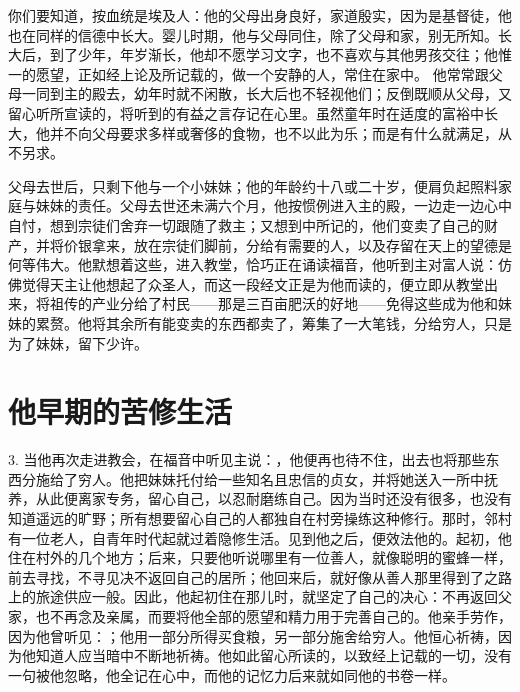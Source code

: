 你们要知道，按血统是埃及人：他的父母出身良好，家道殷实，因为是基督徒，他也在同样的信德中长大。婴儿时期，他与父母同住，除了父母和家，别无所知。长大后，到了少年，年岁渐长，他却不愿学习文字，也不喜欢与其他男孩交往；他惟一的愿望，正如经上论及所记载的，做一个安静的人，常住在家中。 他常常跟父母一同到主的殿去，幼年时就不闲散，长大后也不轻视他们；反倒既顺从父母，又留心听所宣读的，将听到的有益之言存记在心里。虽然童年时在适度的富裕中长大，他并不向父母要求多样或奢侈的食物，也不以此为乐；而是有什么就满足，从不另求。\par

父母去世后，只剩下他与一个小妹妹；他的年龄约十八或二十岁，便肩负起照料家庭与妹妹的责任。父母去世还未满六个月，他按惯例进入主的殿，一边走一边心中自忖，想到宗徒们舍弃一切跟随了救主；又想到中所记的，他们变卖了自己的财产，并将价银拿来，放在宗徒们脚前，分给有需要的人，以及存留在天上的望德是何等伟大。他默想着这些，进入教堂，恰巧正在诵读福音，他听到主对富人说：仿佛觉得天主让他想起了众圣人，而这一段经文正是为他而读的，便立即从教堂出来，将祖传的产业分给了村民——那是三百亩肥沃的好地——免得这些成为他和妹妹的累赘。他将其余所有能变卖的东西都卖了，筹集了一大笔钱，分给穷人，只是为了妹妹，留下少许。\par


\section{他早期的苦修生活}

3. 当他再次走进教会，在福音中听见主说：，他便再也待不住，出去也将那些东西分施给了穷人。他把妹妹托付给一些知名且忠信的贞女，并将她送入一所中抚养，从此便离家专务，留心自己，以忍耐磨练自己。因为当时还没有很多，也没有知道遥远的旷野；所有想要留心自己的人都独自在村旁操练这种修行。那时，邻村有一位老人，自青年时代起就过着隐修生活。见到他之后，便效法他的。起初，他住在村外的几个地方；后来，只要他听说哪里有一位善人，就像聪明的蜜蜂一样，前去寻找，不寻见决不返回自己的居所；他回来后，就好像从善人那里得到了之路上的旅途供应一般。因此，他起初住在那儿时，就坚定了自己的决心：不再返回父家，也不再念及亲属，而要将他全部的愿望和精力用于完善自己的。他亲手劳作，因为他曾听见：；他用一部分所得买食粮，另一部分施舍给穷人。他恒心祈祷，因为他知道人应当暗中不断地祈祷。他如此留心所读的，以致经上记载的一切，没有一句被他忽略，他全记在心中，而他的记忆力后来就如同他的书卷一样。\par

